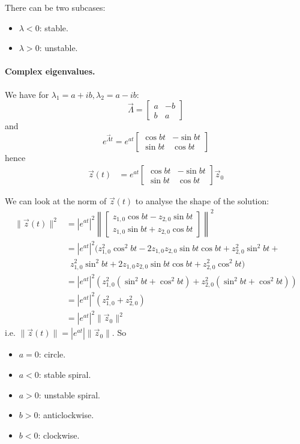 There can be two subcases:
\begin{itemize}
	\item $\lambda < 0$: stable.
	\item $\lambda > 0$: unstable.
\end{itemize}

\paragraph{Complex eigenvalues.} We have for $\lambda_1 = a + ib, \lambda_2 = a - ib$:
\begin{equation*}
	\vec \Lambda = 
	\begin{bmatrix}
		a & -b \\
		b & a
	\end{bmatrix}
\end{equation*}
and
\begin{equation*}
	e^{\vec \Lambda t} =
		e^{at}
		\begin{bmatrix}
			\cos{bt}	& -\sin{bt} \\
			\sin{bt}	& \cos{bt}
		\end{bmatrix}
\end{equation*}
hence
\begin{align*}
	\vec z(t) 	&= 
		e^{at}
		\begin{bmatrix}
			\cos{bt}	& -\sin{bt} \\
			\sin{bt}	& \cos{bt}
		\end{bmatrix}
		\vec z_0
\end{align*}

We can look at the norm of $\vec z(t)$ to analyse the shape of the solution:
\begin{align*}
	\| \vec z(t) \|^2	&= |e^{at}|^2 \left\|
							\begin{bmatrix}
								z_{1, 0}\cos{bt} - z_{2, 0}\sin{bt} \\
								z_{1, 0}\sin{bt} + z_{2, 0}\cos{bt}
							\end{bmatrix} \right\|^2 \\
						&= |e^{at}|^2 (z_{1, 0}^2\cos^2{bt} - 2z_{1, 0}z_{2, 0}\sin{bt}\cos{bt} + z_{2, 0}^2\sin^2{bt} + \\
							&\,\,\,z_{1, 0}^2\sin^2{bt} + 2z_{1, 0}z_{2, 0}\sin{bt}\cos{bt} + z_{2, 0}^2\cos^2{bt}) \\
						&= |e^{at}|^2 (z_{1, 0}^2 (\sin^2{bt} + \cos^2{bt}) + z_{2, 0}^2 (\sin^2{bt} + \cos^2{bt})) \\
						&= |e^{at}|^2 (z_{1, 0}^2 + z_{2, 0}^2) \\
						&= |e^{at}|^2 \| \vec z_0 \|^2
\end{align*}
i.e. $\|\vec z(t)\| = |e^{at}| \|\vec z_0\|$. So
\begin{itemize}
	\item $a = 0$: circle.
	\item $a < 0$: stable spiral.
	\item $a > 0$: unstable spiral.
	\item $b > 0$: anticlockwise.
	\item $b < 0$: clockwise.
\end{itemize}

